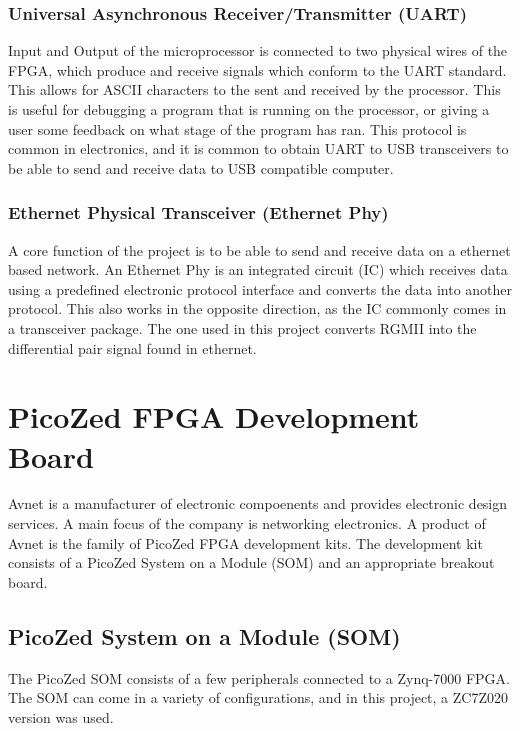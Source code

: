 \subsubsection{Universal Asynchronous Receiver/Transmitter (UART)}

\par Input and Output of the microprocessor is connected to two physical wires of the FPGA, which produce and 
receive signals which conform to the UART standard. This allows for ASCII characters to the sent and received by 
the processor. This is useful for debugging a program that is running on the processor, or giving a user some 
feedback on what stage of the program has ran. This protocol is common in electronics, and it is common to obtain 
UART to USB transceivers to be able to send and receive data to USB compatible computer.

\subsubsection{Ethernet Physical Transceiver (Ethernet Phy)}

\par A core function of the project is to be able to send and receive data on a ethernet based network. An Ethernet 
Phy is an integrated circuit (IC) which receives data using a predefined electronic protocol interface and converts 
the data into another protocol. This also works in the opposite direction, as the IC commonly comes in a transceiver 
package. The one used in this project converts RGMII into the differential pair signal found in ethernet. 

\section{PicoZed FPGA Development Board}

\par Avnet is a manufacturer of electronic compoenents and provides electronic design services. A main focus of the company
is networking electronics. A product of Avnet is the family of PicoZed FPGA development kits.
The development kit consists of a PicoZed System on a Module (SOM) and an appropriate breakout board.

\subsection{PicoZed System on a Module (SOM)}

\par The PicoZed SOM consists of a few peripherals connected to a Zynq-7000 FPGA. The SOM can come in a variety of 
configurations, and in this project, a ZC7Z020 version was used.

